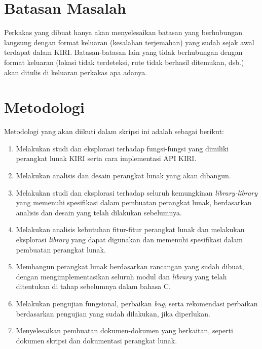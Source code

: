 \section{Batasan Masalah}
\label{sec:batasan}
Perkakas yang dibuat hanya akan menyelesaikan batasan yang berhubungan langsung dengan format keluaran (kesalahan terjemahan) yang sudah sejak awal terdapat dalam KIRI. Batasan-batasan lain yang tidak berhubungan dengan format keluaran (lokasi tidak terdeteksi, rute tidak berhasil ditemukan, dsb.) akan ditulis di keluaran perkakas apa adanya.

\section{Metodologi}
\label{sec:metlit}
Metodologi yang akan diikuti dalam skripsi ini adalah sebagai berikut:
	\begin{enumerate}
		\item Melakukan studi dan eksplorasi terhadap fungsi-fungsi yang dimiliki perangkat lunak KIRI serta cara implementasi API KIRI.
		\item Melakukan analisis dan desain perangkat lunak yang akan dibangun.
	    \item Melakukan studi dan eksplorasi terhadap seluruh kemungkinan \textit{library-library} yang memenuhi spesifikasi dalam pembuatan perangkat lunak, berdasarkan analisis dan desain yang telah dilakukan sebelumnya.
		\item Melakukan analisis kebutuhan fitur-fitur perangkat lunak dan melakukan eksplorasi \textit{library} yang dapat digunakan dan memenuhi spesifikasi dalam pembuatan perangkat lunak.
		\item Membangun perangkat lunak berdasarkan rancangan yang sudah dibuat, dengan mengimplementasikan seluruh modul dan \textit{library} yang telah ditentukan di tahap sebelumnya dalam bahasa C.
		\item Melakukan pengujian fungsional, perbaikan \textit{bug}, serta rekomendasi perbaikan berdasarkan pengujian yang sudah dilakukan, jika diperlukan.
		\item Menyelesaikan pembuatan dokumen-dokumen yang berkaitan, seperti dokumen skripsi dan dokumentasi perangkat lunak.
	\end{enumerate}

